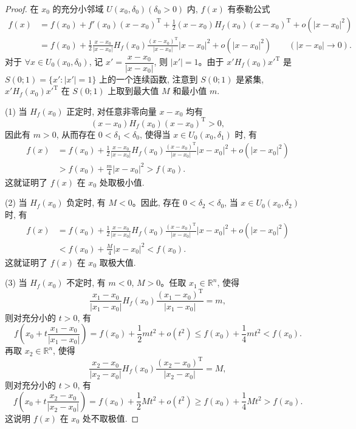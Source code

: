 \begin{proof}
在 $x_0$ 的充分小邻域 $U(x_0,\delta_0)(\delta_0>0)$ 内, $f(x)$ 有泰勒公式
\[
\begin{aligned}
  f(x)
  &=f(x_0)+f'(x_0)(x-x_0)^{\mathrm T}
    +\frac12(x-x_0)H_f(x_0)(x-x_0)^{\mathrm T}
    +o(|x-x_0|^2)\\
  &=f(x_0)+\frac12
    \frac{x-x_0}{|x-x_0|}
    H_f(x_0)
    \frac{(x-x_0)^{\mathrm T}}{|x-x_0|}
    |x-x_0|^2
    +o(|x-x_0|^2)
    \qquad (|x-x_0|\to0).
\end{aligned}
\]
对于 $\forall x\in U_0(x_0,\delta_0)$, 记 $x'=\dfrac{x-x_0}{|x-x_0|}$, 则 $|x'|=1$。由于 $x'H_f(x_0)x'^{\mathrm T}$ 是 $S(0;1)=\{x':|x'|=1\}$ 上的一个连续函数, 注意到 $S(0;1)$ 是紧集, $x'H_f(x_0)x'^{\mathrm T}$ 在 $S(0;1)$ 上取到最大值 $M$ 和最小值 $m$.

\noindent (1) 当 $H_f(x_0)$ 正定时, 对任意非零向量 $x-x_0$ 均有
\[
  (x-x_0)H_f(x_0)(x-x_0)^{\mathrm T}>0,
\]
因此有 $m>0$, 从而存在 $0<\delta_1<\delta_0$, 使得当 $x\in U_0(x_0,\delta_1)$ 时, 有
\[
\begin{aligned}
  f(x)
  &=f(x_0)+\frac12
    \frac{x-x_0}{|x-x_0|}
    H_f(x_0)
    \frac{(x-x_0)^{\mathrm T}}{|x-x_0|}
    |x-x_0|^2+o(|x-x_0|^2)\\
  &>f(x_0)+\frac m4|x-x_0|^2>f(x_0).
\end{aligned}
\]
这就证明了 $f(x)$ 在 $x_0$ 处取极小值.

\noindent (2) 当 $H_f(x_0)$ 负定时, 有 $M<0$。因此, 存在 $0<\delta_2<\delta_0$, 当 $x\in U_0(x_0,\delta_2)$ 时, 有
\[
\begin{aligned}
  f(x)
  &=f(x_0)+\frac12
    \frac{x-x_0}{|x-x_0|}
    H_f(x_0)
    \frac{(x-x_0)^{\mathrm T}}{|x-x_0|}
    |x-x_0|^2+o(|x-x_0|^2)\\
  &<f(x_0)+\frac M4|x-x_0|^2<f(x_0).
\end{aligned}
\]
这就证明了 $f(x)$ 在 $x_0$ 取极大值.

\noindent (3) 当 $H_f(x_0)$ 不定时, 有 $m<0$, $M>0$。任取 $x_1\in\mathbb R^n$, 使得
\[
  \frac{x_1-x_0}{|x_1-x_0|}
  H_f(x_0)
  \frac{(x_1-x_0)^{\mathrm T}}{|x_1-x_0|}
  =m,
\]
则对充分小的 $t>0$, 有
\[
  f\left(x_0+t\frac{x_1-x_0}{|x_1-x_0|}\right)
  =f(x_0)+\frac12mt^2+o(t^2)
  \leqslant f(x_0)+\frac14mt^2<f(x_0).
\]
再取 $x_2\in\mathbb R^n$, 使得
\[
  \frac{x_2-x_0}{|x_2-x_0|}
  H_f(x_0)
  \frac{(x_2-x_0)^{\mathrm T}}{|x_2-x_0|}
  =M,
\]
则对充分小的 $t>0$, 有
\[
  f\left(x_0+t\frac{x_2-x_0}{|x_2-x_0|}\right)
  =f(x_0)+\frac12Mt^2+o(t^2)
  \geqslant f(x_0)+\frac14Mt^2>f(x_0).
\]
这说明 $f(x)$ 在 $x_0$ 处不取极值.
\end{proof}


